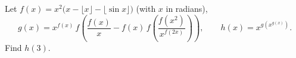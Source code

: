 Let $f(x)=x^2\bigl(x-\lfloor x\rfloor-\lfloor\sin x\rfloor\bigr)$ (with $x$ in radians),
\[g(x)=x^{f(x)}\,f\!\left(\dfrac{f(x)}x-f(x)\,f\!\left(\dfrac{f(x^2)}{x^{f(2x)}}\right)\right),\qquad h(x)=x^{g\left(x^{g(x)}\right)}.\]
Find $h(3)$.
